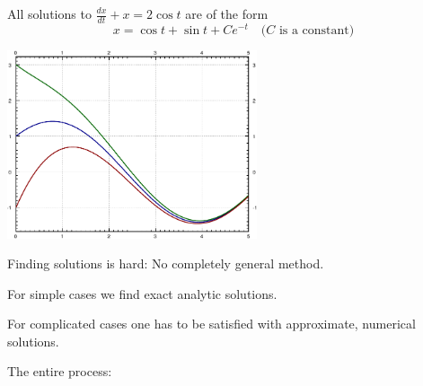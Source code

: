 \documentclass[10pt,aspectratio=169]{beamer}
\begin{document}
\begin{frame}
All solutions to 
\quad
$\displaystyle
\frac{dx}{dt} + x = 2 \cos t$ \quad are of the form
\[
x = \cos t + \sin t + C e^{-t}  \quad \text{($C$ is a constant)}
\]
\pause
\begin{center}
\includegraphics[width=2.9in]{../figures/intro-plots-alt}
\end{center}

\end{frame}

\begin{frame}
Finding solutions is hard: No completely general method.

\medskip
\pause

For simple cases we find exact analytic solutions.

\medskip
\pause

For complicated cases one has to be satisfied with approximate, numerical
solutions.

\end{frame}

\begin{frame}

The entire process:

\pause
\medskip

\begin{center}
\end{center}
\end{frame}
\end{document}
